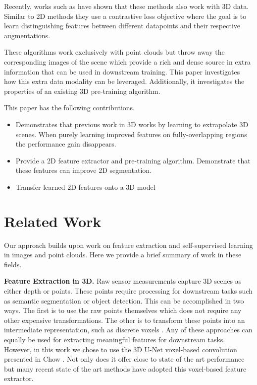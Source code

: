 \documentclass[10pt,twocolumn,letterpaper]{article}
\begin{document}
Recently, works such as \cite{xie2020pointcontrast} have shown that these methods also work with 3D data. Similar to 2D methods they use a contrastive loss objective where the goal is to learn distinguishing features between different datapoints and their respective augmentations.

These algorithms work exclusively with point clouds but throw away the corresponding images of the scene which provide a rich and dense source in extra information that can be used in downstream training. This paper investigates how this extra data modality can be leveraged. Additionally, it investigates the properties of an existing 3D pre-training algorithm.

This paper has the following contributions.

\begin{itemize}
    \item Demonstrates that previous work in 3D \cite{xie2020pointcontrast} works by learning to extrapolate 3D scenes. When purely learning improved features on fully-overlapping regions the performance gain disappears.
    \item Provide a 2D feature extractor and pre-training algorithm. Demonstrate that these features can improve 2D segmentation.
    \item Transfer learned 2D features onto a 3D model
\end{itemize}

\section{Related Work}
\label{sec:relatedWork}

Our approach builds upon work on feature extraction and self-supervised learning in images and point clouds. Here we provide a brief summary of work in these fields.

\textbf{Feature Extraction in 3D.} Raw sensor measurements capture 3D scenes as either depth or points. These points require processing for downstream tasks such as semantic segmentation or object detection. This can be accomplished in two ways. The first is to use the raw points themselves \cite{charles2017PointNet, qi2017pointnet++, Tatarchenko2018TangentConvolutions, thomas2019KPConv, wu2019PointConv, engelmann2020Dilated, zhao2020point} which does not require any other expensive transformations. The other is to transform these points into an intermediate representation, such as discrete voxels \cite{cicek20163d, riegler2017octnet, graham20183D, choy20194d}. Any of these approaches can equally be used for extracting meaningful features for downstream tasks. However, in this work we chose to use the 3D U-Net voxel-based convolution presented in Chow \etal \cite{choy20194d}. Not only does it offer close to state of the art performance but many recent state of the art methods \cite{jiang2020pointgroup, chen2021hierarchical} have adopted this voxel-based feature extractor.
\end{document}
